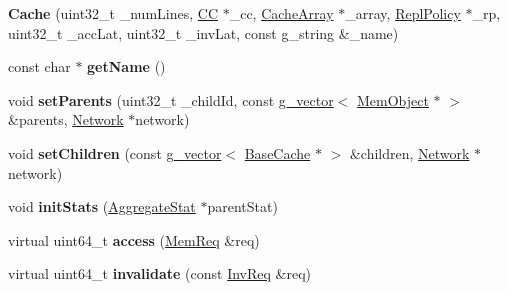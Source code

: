 \begin{DoxyCompactItemize}
\item 
\hypertarget{classCache_a398112ee381973ef3777746a31900320}{{\bfseries Cache} (uint32\-\_\-t \-\_\-num\-Lines, \hyperlink{classCC}{C\-C} $\ast$\-\_\-cc, \hyperlink{classCacheArray}{Cache\-Array} $\ast$\-\_\-array, \hyperlink{classReplPolicy}{Repl\-Policy} $\ast$\-\_\-rp, uint32\-\_\-t \-\_\-acc\-Lat, uint32\-\_\-t \-\_\-inv\-Lat, const g\-\_\-string \&\-\_\-name)}\label{classCache_a398112ee381973ef3777746a31900320}

\item 
\hypertarget{classCache_a8c675e7f17bd8ac8fbb9f3faa658703c}{const char $\ast$ {\bfseries get\-Name} ()}\label{classCache_a8c675e7f17bd8ac8fbb9f3faa658703c}

\item 
\hypertarget{classCache_a79ba01ab96d6949c8cf3f71cf310d9bd}{void {\bfseries set\-Parents} (uint32\-\_\-t \-\_\-child\-Id, const \hyperlink{classg__vector}{g\-\_\-vector}$<$ \hyperlink{classMemObject}{Mem\-Object} $\ast$ $>$ \&parents, \hyperlink{classNetwork}{Network} $\ast$network)}\label{classCache_a79ba01ab96d6949c8cf3f71cf310d9bd}

\item 
\hypertarget{classCache_a5c6c05094ed04256fd6f77a3ca20673e}{void {\bfseries set\-Children} (const \hyperlink{classg__vector}{g\-\_\-vector}$<$ \hyperlink{classBaseCache}{Base\-Cache} $\ast$ $>$ \&children, \hyperlink{classNetwork}{Network} $\ast$network)}\label{classCache_a5c6c05094ed04256fd6f77a3ca20673e}

\item 
\hypertarget{classCache_a3cd51a37ecac027028c662279fed96e3}{void {\bfseries init\-Stats} (\hyperlink{classAggregateStat}{Aggregate\-Stat} $\ast$parent\-Stat)}\label{classCache_a3cd51a37ecac027028c662279fed96e3}

\item 
\hypertarget{classCache_ac0bf42d7a6c5a942e53ee5aa6f1cb10b}{virtual uint64\-\_\-t {\bfseries access} (\hyperlink{structMemReq}{Mem\-Req} \&req)}\label{classCache_ac0bf42d7a6c5a942e53ee5aa6f1cb10b}

\item 
\hypertarget{classCache_a2b21fdc8a63f1c1a60b84643debe82db}{virtual uint64\-\_\-t {\bfseries invalidate} (const \hyperlink{structInvReq}{Inv\-Req} \&req)}\label{classCache_a2b21fdc8a63f1c1a60b84643debe82db}

\end{DoxyCompactItemize}
